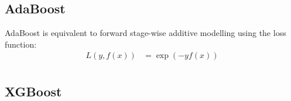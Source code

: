 \documentclass{book}
\begin{document}
\subsection{AdaBoost}
AdaBoost is equivalent to forward stage-wise additive modelling using the loss function:
\begin{align*}
L(y, f(x)) &= \exp{(-y f(x))} \\
\end{align*}

\subsection{XGBoost}

%
%
%
%
%
%
\end{document}
